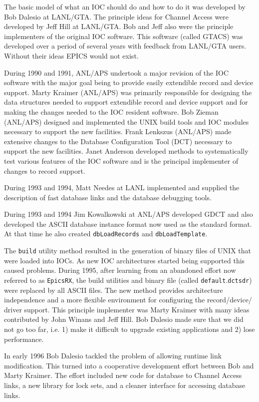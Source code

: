 The basic model of what an IOC should do and how to do it was developed by Bob Dalesio at LANL/GTA. The principle 
ideas for Channel Access were developed by Jeff Hill at LANL/GTA. Bob and Jeff also were the principle implementers 
of the original IOC software. This software (called GTACS) was developed over a period of several years with feedback 
from LANL/GTA users. Without their ideas EPICS would not exist.

During 1990 and 1991, ANL/APS undertook a major revision of the IOC software with the major goal being to provide 
easily extendible record and device support. Marty Kraimer (ANL/APS) was primarily responsible for designing the data 
structures needed to support extendible record and device support and for making the changes needed to the IOC resident 
software. Bob Zieman (ANL/APS) designed and implemented the UNIX build tools and IOC modules necessary to 
support the new facilities. Frank Lenkszus (ANL/APS) made extensive changes to the Database Configuration Tool 
(DCT) necessary to support the new facilities. Janet Anderson developed methods to systematically test various features 
of the IOC software and is the principal implementer of changes to record support.

During 1993 and 1994, Matt Needes at LANL implemented and supplied the description of fast database links and the 
database debugging tools.

During 1993 and 1994 Jim Kowalkowski at ANL/APS developed GDCT and also developed the ASCII database instance 
format now used as the standard format. At that time he also created \verb|dbLoadRecords| and \verb|dbLoadTemplate|.

The \verb|build| utility method resulted in the generation of binary files of UNIX that were loaded into IOCs. As new IOC 
architectures started being supported this caused problems. During 1995, after learning from an abandoned effort now 
referred to as \verb|EpicsRX|, the build utilities and binary file (called \verb|default|.\verb|dctsdr|) were replaced by all ASCII files. 
The new method provides architecture independence and a more flexible environment for configuring the record/device/
driver support. This principle implementer was Marty Kraimer with many ideas contributed by John Winans and Jeff Hill. 
Bob Dalesio made sure that we did not go too far, i.e. 1) make it difficult to upgrade existing applications and 2) lose 
performance.

In early 1996 Bob Dalesio tackled the problem of allowing runtime link modification. This turned into a cooperative 
development effort between Bob and Marty Kraimer. The effort included new code for database to Channel Access links, 
a new library for lock sets, and a cleaner interface for accessing database links.

